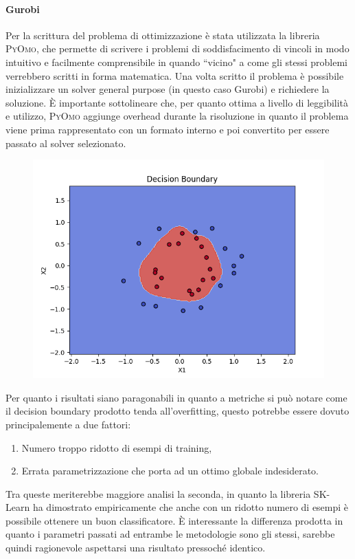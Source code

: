 \documentclass[12pt]{article}
\begin{document}
\paragraph{Gurobi} Per la scrittura del problema di ottimizzazione è stata utilizzata la libreria \textsc{PyOmo},
che permette di scrivere i problemi di soddisfacimento di vincoli in modo intuitivo e facilmente comprensibile in quando “vicino" a come gli stessi problemi verrebbero scritti in forma matematica.
Una volta scritto il problema è possibile inizializzare un solver general purpose (in questo caso Gurobi) e richiedere la soluzione.
È importante sottolineare che, per quanto ottima a livello di leggibilità e utilizzo, 
\textsc{PyOmo} aggiunge overhead durante la risoluzione in quanto il problema viene prima rappresentato con un formato interno e poi convertito per essere passato al solver selezionato.

\begin{figure}[H]
  \centering
  \includegraphics[width=\linewidth]{img/decision_boundary_gurobi.png}
\end{figure}

Per quanto i risultati siano paragonabili in quanto a metriche si può notare come il decision boundary prodotto tenda all'overfitting,
questo potrebbe essere dovuto principalemente a due fattori:
\begin{enumerate}
  \item Numero troppo ridotto di esempi di training,
  \item Errata parametrizzazione che porta ad un ottimo globale indesiderato.
\end{enumerate}
Tra queste meriterebbe maggiore analisi la seconda, in quanto la libreria SK-Learn ha dimostrato empiricamente che anche con un ridotto numero di esempi è possibile ottenere un buon classificatore.
È interessante la differenza prodotta in quanto i parametri passati ad entrambe le metodologie sono gli stessi, sarebbe quindi ragionevole aspettarsi una risultato pressoché identico.
\end{document}
